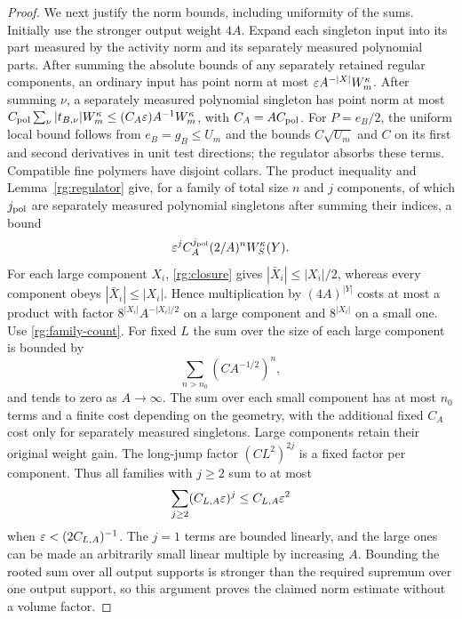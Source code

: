 \begin{proof}
We next justify the norm bounds, including uniformity of the sums.  Initially use the stronger output weight $4A$.  Expand each singleton input into its part measured by the activity norm and its separately measured polynomial parts.  After summing the absolute bounds of any separately retained regular components, an ordinary input has point norm at most $\varepsilon A^{-|X|}W_m^\kappa$.  After summing $\nu$, a separately measured polynomial singleton has point norm at most $C_{\rm pol}\sum_\nu|t_{B,\nu}|W_m^\kappa\le(C_A\varepsilon)A^{-1}W_m^\kappa$, with $C_A=AC_{\rm pol}$.  For $P=e_B/2$, the uniform local bound follows from $e_B=g_B\le U_m$ and the bounds $C\sqrt{U_m}$ and $C$ on its first and second derivatives in unit test directions; the regulator absorbs these terms.  Compatible fine polymers have disjoint collars.  The product inequality and Lemma~\ref{rg:regulator} give, for a family of total size $n$ and $j$ components, of which $j_{\rm pol}$ are separately measured polynomial singletons after summing their indices, a bound
\[
 \varepsilon^j C_A^{j_{\rm pol}}(2/A)^n W_S^\kappa(Y).
\]
For each large component $X_i$, \eqref{rg:closure} gives $|\bar X_i|\le |X_i|/2$, whereas every component obeys $|\bar X_i|\le|X_i|$.  Hence multiplication by $(4A)^{|Y|}$ costs at most a product with factor $8^{|X_i|}A^{-|X_i|/2}$ on a large component and $8^{|X_i|}$ on a small one.  Use \eqref{rg:family-count}.  For fixed $L$ the sum over the size of each large component is bounded by
\[
 \sum_{n>n_0}(C A^{-1/2})^n,
\]
and tends to zero as $A\to\infty$.  The sum over each small component has at most $n_0$ terms and a finite cost depending on the geometry, with the additional fixed $C_A$ cost only for separately measured singletons.  Large components retain their original weight gain.  The long-jump factor $(CL^2)^{2j}$ is a fixed factor per component.  Thus all families with $j\ge2$ sum to at most
\[
 \sum_{j\ge2}(C_{L,A}\varepsilon)^j\le C_{L,A}\varepsilon^2
\]
when $\varepsilon<(2C_{L,A})^{-1}$.  The $j=1$ terms are bounded linearly, and the large ones can be made an arbitrarily small linear multiple by increasing $A$.  Bounding the rooted sum over all output supports is stronger than the required supremum over one output support, so this argument proves the claimed norm estimate without a volume factor.


\end{proof}
